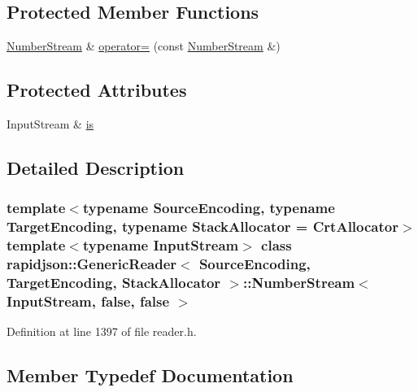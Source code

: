 \subsection*{Protected Member Functions}
\begin{DoxyCompactItemize}
\item 
\mbox{\hyperlink{classrapidjson_1_1_generic_reader_1_1_number_stream}{Number\+Stream}} \& \mbox{\hyperlink{classrapidjson_1_1_generic_reader_1_1_number_stream_3_01_input_stream_00_01false_00_01false_01_4_a63cb3bd176574a4ecf81da89ae720e26}{operator=}} (const \mbox{\hyperlink{classrapidjson_1_1_generic_reader_1_1_number_stream}{Number\+Stream}} \&)
\end{DoxyCompactItemize}
\subsection*{Protected Attributes}
\begin{DoxyCompactItemize}
\item 
Input\+Stream \& \mbox{\hyperlink{classrapidjson_1_1_generic_reader_1_1_number_stream_3_01_input_stream_00_01false_00_01false_01_4_a89e9acf3bfcc7992f0122383e2c6349e}{is}}
\end{DoxyCompactItemize}


\subsection{Detailed Description}
\subsubsection*{template$<$typename Source\+Encoding, typename Target\+Encoding, typename Stack\+Allocator = Crt\+Allocator$>$\newline
template$<$typename Input\+Stream$>$\newline
class rapidjson\+::\+Generic\+Reader$<$ Source\+Encoding, Target\+Encoding, Stack\+Allocator $>$\+::\+Number\+Stream$<$ Input\+Stream, false, false $>$}



Definition at line 1397 of file reader.\+h.



\subsection{Member Typedef Documentation}
\mbox{\label{classrapidjson_1_1_generic_reader_1_1_number_stream_3_01_input_stream_00_01false_00_01false_01_4_a2a945ef08d04099027c32f72821a12c0}} 

